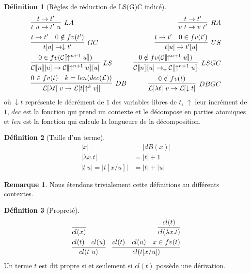\documentclass[11pt,a4paper]{article}
\theoremstyle{definition}
\newtheorem{definition}{Définition}[section]
\newtheorem*{remark}{Remarque}
\newcommand{\mcl}{\mathcal{L}}
\newcommand{\da}{\downarrow}
\newcommand{\ua}{\uparrow}
\begin{document}
\begin{definition}[Règles de réduction de LS(G)C indicé]
      \begin{align*}
    &\infer[LA]{t~u\rightarrow t'~u}{t \rightarrow t'}
 &\infer[RA]{v~t\rightarrow v~t'}{t \rightarrow t'}\\
&\infer[GC]{t[u]\rightarrow \da t'}{t \rightarrow t' & 0 \notin fv(t') }
&\infer[US]{t[u]\rightarrow t'[u]}{t \rightarrow t' & 0 \in fv(t')}\\
&\infer[LS]{\mathcal{C}\llbracket n \rrbracket [u]\rightarrow \mathcal{C}\llbracket \ua^{n+1} u \rrbracket [u]}{0 \in fv(\mathcal{C}\llbracket \ua^{n+1} u \rrbracket)}
&\infer[LSGC]{\mathcal{C}\llbracket n \rrbracket [u]\rightarrow \da \mathcal{C}\llbracket \ua^{n+1} u \rrbracket}{0 \notin fv(\mathcal{C}\llbracket \ua^{n+1} u \rrbracket) }\\
&\infer[DB]{\mathcal{L}[\lambda t]~v \rightarrow \mathcal{L}[t[\ua^{k} v]]}{0 \in fv(t) & k= len(dec(\mcl))}
&\infer[DBGC]{\mathcal{L}[\lambda t]~v \rightarrow \mathcal{L}[\da t]}{0 \notin fv(t)}
\end{align*}
où $\da t$ représente le décrément de $1$ des variables libres de $t$, $\ua$ leur incrément de $1$, 
$dec$ est la fonction qui prend un contexte et le décompose en parties atomiques et $len$ est la fonction qui calcule la longueure de la décomposition.
\end{definition}



\begin{definition}[Taille d'un terme]
  \begin{align*}
    |x| &= |dB(x)|\\
    |\lambda x.t| &= |t| + 1\\
    |t~u| = |t[x/u]| &= |t| + |u|
  \end{align*}
\end{definition}
\begin{remark}
  Nous étendons trivialement cette définitions au différents contextes.
\end{remark}

\begin{definition}[Propreté]
\begin{align*}
    &\infer{cl(x)}{}
 &\infer{cl(\lambda x.t)}{cl(t)}\\
 &\infer{cl(t~u)}{cl(t) & cl(u) }
&\infer{cl(t[x/u])}{cl(t)&cl(u)&x\in fv(t)}
  \end{align*}
Un terme $t$ est dit propre si et seulement si $cl(t)$ possède une dérivation.
\end{definition}
\end{document}

